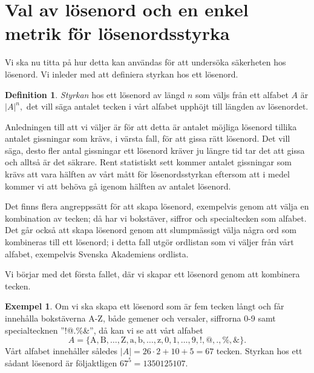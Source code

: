 \documentclass[a4paper]{article}
\theoremstyle{definition}
\newtheorem{definition}{Definition}
\newtheorem{example}{Exempel}
\theoremstyle{remark}
\begin{document}
\section{Val av lösenord och en enkel metrik för lösen\-ords\-styrka}
\label{sec:choice}
Vi ska nu titta på hur detta kan användas för att undersöka säkerheten hos
lösenord.
Vi inleder med att definiera styrkan hos ett lösenord.
\begin{definition}\label{def:passwdstrength}
  \emph{Styrkan} hos ett lösenord av längd \(n\) som väljs från ett alfabet 
  \(A\) är \(|A|^n,\) det vill säga antalet tecken i vårt alfabet upphöjt till 
  längden av lösenordet.
\end{definition}
Anledningen till att vi väljer  är för att detta 
är antalet möjliga lösenord tillika antalet gissningar som krävs, i värsta 
fall, för att gissa rätt lösenord.
Det vill säga, desto fler antal gissningar ett lösenord kräver ju längre tid 
tar det att gissa och alltså är det säkrare.
Rent statistiskt sett kommer antalet gissningar som krävs att vara hälften av 
vårt mått för lösenordsstyrkan eftersom att i medel kommer vi att behöva gå 
igenom hälften av antalet lösenord.

Det finns flera angreppssätt för att skapa lösenord, exempelvis genom att
välja en kombination av tecken; då har vi bokstäver, siffror och specialtecken 
som alfabet.
Det går också att skapa lösenord genom att slumpmässigt välja några ord som
kombineras till ett lösenord; i detta fall utgör ordlistan som vi väljer från 
vårt alfabet, exempelvis Svenska Akademiens ordlista.

Vi börjar med det första fallet, där vi skapar ett lösenord genom att kombinera
tecken.
\begin{example}\label{ex:characters}
  Om vi ska skapa ett lösenord som är fem tecken långt och får innehålla
  bokstäverna A-Z, både gemener och versaler, siffrorna 0-9 samt specialtecknen 
  ''!@.\%\&'', då kan vi se att vårt alfabet \[A = \{\text{A}, \text{B}, 
  \ldots, \text{Z}, \text{a}, \text{b}, \ldots, \text{z}, 0, 1, \ldots, 9, 
  \text{!}, \text{@}, \text{.}, \text{\%}, \text{\&}\}.\]
  Vårt alfabet innehåller således \(|A| = 26\cdot 2 + 10 + 5 = 67\) tecken.
  Styrkan hos ett sådant lösenord är följaktligen \(67^5 = 1350125107.\)
\end{example}
\end{document}
